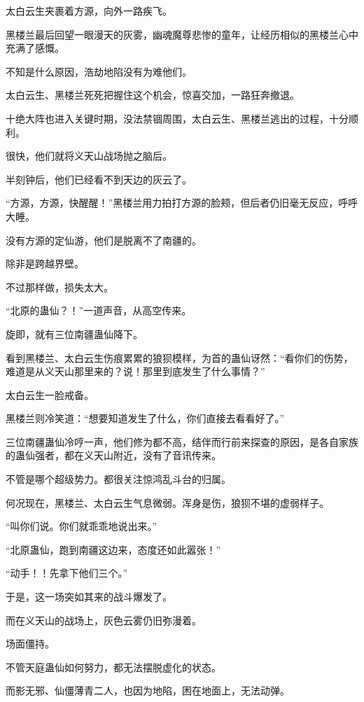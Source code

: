 
\begin{this_body}

太白云生夹裹着方源，向外一路疾飞。

黑楼兰最后回望一眼漫天的灰雾，幽魂魔尊悲惨的童年，让经历相似的黑楼兰心中充满了感慨。

不知是什么原因，浩劫地陷没有为难他们。

太白云生、黑楼兰死死把握住这个机会，惊喜交加，一路狂奔撤退。

十绝大阵也进入关键时期，没法禁锢周围，太白云生、黑楼兰逃出的过程，十分顺利。

很快，他们就将义天山战场抛之脑后。

半刻钟后，他们已经看不到天边的灰云了。

“方源，方源，快醒醒！”黑楼兰用力拍打方源的脸颊，但后者仍旧毫无反应，呼呼大睡。

没有方源的定仙游，他们是脱离不了南疆的。

除非是跨越界壁。

不过那样做，损失太大。

“北原的蛊仙？！”一道声音，从高空传来。

旋即，就有三位南疆蛊仙降下。

看到黑楼兰、太白云生伤痕累累的狼狈模样，为首的蛊仙讶然：“看你们的伤势，难道是从义天山那里来的？说！那里到底发生了什么事情？”

太白云生一脸戒备。

黑楼兰则冷笑道：“想要知道发生了什么，你们直接去看看好了。”

三位南疆蛊仙冷哼一声，他们修为都不高，结伴而行前来探查的原因，是各自家族的蛊仙强者，都在义天山附近，没有了音讯传来。

不管是哪个超级势力。都很关注惊鸿乱斗台的归属。

何况现在，黑楼兰、太白云生气息微弱。浑身是伤，狼狈不堪的虚弱样子。

“叫你们说。你们就乖乖地说出来。”

“北原蛊仙，跑到南疆这边来，态度还如此嚣张！”

“动手！！先拿下他们三个。”

于是，这一场突如其来的战斗爆发了。

而在义天山的战场上，灰色云雾仍旧弥漫着。

场面僵持。

不管天庭蛊仙如何努力，都无法摆脱虚化的状态。

而影无邪、仙僵薄青二人，也因为地陷，困在地面上，无法动弹。


\end{this_body}
